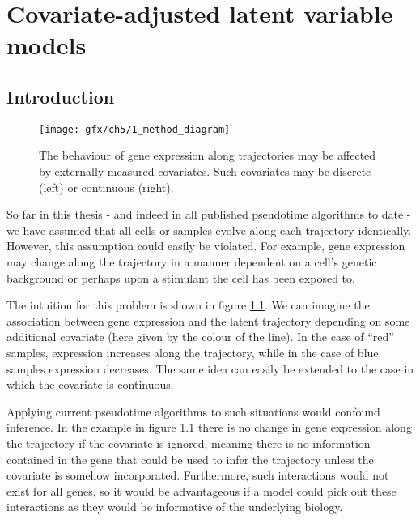 \chapter{Covariate-adjusted latent variable models}\label{ch:phenotimechap} %



\section{Introduction}

\begin{figure}
\centering
  \texttt{[image: gfx/ch5/1\_method\_diagram]}
  \caption{The behaviour of gene expression along trajectories may be affected by externally measured covariates.
  Such covariates may be discrete (left) or continuous (right).
  } \label{fig:phenotime_diagram}
\end{figure}

So far in this thesis - and indeed in all published pseudotime algorithms to date - we have assumed that all cells or samples evolve along each trajectory identically. However, this assumption could easily be violated. For example, gene expression may change along the trajectory in a manner dependent on a cell's genetic background or perhaps upon a stimulant the cell has been exposed to.

The intuition for this problem is shown in figure \ref{fig:phenotime_diagram}. We can imagine the association between gene expression and the latent trajectory depending on some additional covariate (here given by the colour of the line). In the case of ``red'' samples, expression increases along the trajectory, while in the case of blue samples expression decreases. The same idea can easily be extended to the case in which the covariate is continuous.

Applying current pseudotime algorithms to such situations would confound inference. In the example in figure \ref{fig:phenotime_diagram} there is no change in gene expression along the trajectory if the covariate is ignored, meaning there is no information contained in the gene that could be used to infer the trajectory unless the covariate is somehow incorporated. Furthermore, such interactions would not exist for all genes, so it would be advantageous if a model could pick out these interactions as they would be informative of the underlying biology.

